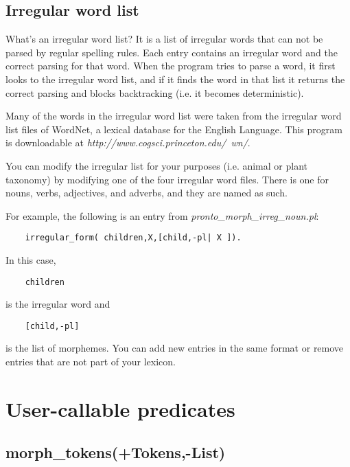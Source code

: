 \subsection{Irregular word list}

What's an irregular word list?  It is a list of irregular words
that can not be parsed by regular spelling rules. Each entry
contains an irregular  word and the correct parsing for that word.
When the program tries to parse a word, it first looks to the
irregular word list, and if it finds the word in that list it
returns the correct parsing and blocks backtracking (i.e. it
becomes deterministic).\newline

Many of the words in the irregular word list were taken from the
irregular word list files of WordNet, a lexical database for the
English Language.  This program is downloadable at
\emph{http://www.cogsci.princeton.edu/~wn/}.\newline

You can modify the irregular list for your purposes (i.e. animal
or plant taxonomy) by modifying one of the four irregular word
files. There is one for nouns, verbs, adjectives, and adverbs, and
they are named as such.\newline

For example, the following is an entry from
\emph{pronto\_morph\_irreg\_noun.pl}:

    \begin{verbatim}
    irregular_form( children,X,[child,-pl| X ]).\end{verbatim}


In this case,

    \begin{verbatim}
    children\end{verbatim}

is the irregular word and

    \begin{verbatim}
    [child,-pl]\end{verbatim}

is the list of morphemes.  You can add new entries in the same
format or remove entries that are not part of your lexicon.


\section{User-callable predicates}

\subsection{morph\_tokens(+Tokens,-List)}

